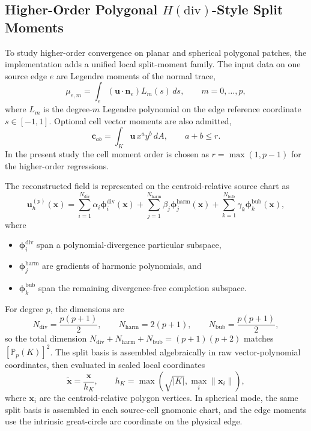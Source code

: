 \documentclass[11pt]{article}
\newcommand{\uh}{\mathbf{u}_h}
\newcommand{\x}{\mathbf{x}}
\begin{document}
\subsection{Higher-Order Polygonal \(H(\mathrm{div})\)-Style Split Moments}

To study higher-order convergence on planar and spherical polygonal patches,
the implementation adds a unified local split-moment family.  The input data on
one source edge \(e\) are Legendre moments of the normal trace,
\begin{equation}
  \mu_{e,m}
  =
  \int_e (\mathbf{u}\cdot \mathbf{n}_e) L_m(s)\, ds,
  \qquad m=0,\dots,p,
  \label{eq:edge-moment-dofs}
\end{equation}
where \(L_m\) is the degree-\(m\) Legendre polynomial on the edge reference
coordinate \(s\in[-1,1]\).  Optional cell vector moments are also admitted,
\begin{equation}
  \mathbf{c}_{ab}
  =
  \int_K \mathbf{u}\, x^a y^b \, dA,
  \qquad a+b \le r.
  \label{eq:cell-vector-moments}
\end{equation}
In the present study the cell moment order is chosen as \(r=\max(1,p-1)\) for
the higher-order regressions.

The reconstructed field is represented on the centroid-relative source chart as
\begin{equation}
  \uh^{(p)}(\x)
  =
  \sum_{i=1}^{N_{\mathrm{div}}} \alpha_i \boldsymbol{\phi}^{\mathrm{div}}_i(\x)
  +
  \sum_{j=1}^{N_{\mathrm{harm}}} \beta_j \boldsymbol{\phi}^{\mathrm{harm}}_j(\x)
  +
  \sum_{k=1}^{N_{\mathrm{bub}}} \gamma_k \boldsymbol{\phi}^{\mathrm{bub}}_k(\x),
  \label{eq:split-moment-field}
\end{equation}
where
\begin{itemize}
  \item \(\boldsymbol{\phi}^{\mathrm{div}}_i\) span a polynomial-divergence
        particular subspace,
  \item \(\boldsymbol{\phi}^{\mathrm{harm}}_j\) are gradients of harmonic
        polynomials, and
  \item \(\boldsymbol{\phi}^{\mathrm{bub}}_k\) span the remaining
        divergence-free completion subspace.
\end{itemize}
For degree \(p\), the dimensions are
\[
  N_{\mathrm{div}}=\frac{p(p+1)}{2},\qquad
  N_{\mathrm{harm}}=2(p+1),\qquad
  N_{\mathrm{bub}}=\frac{p(p+1)}{2},
\]
so the total dimension
\(
N_{\mathrm{div}}+N_{\mathrm{harm}}+N_{\mathrm{bub}}=(p+1)(p+2)
\)
matches \([\mathbb{P}_p(K)]^2\).  The split basis is assembled algebraically in
raw vector-polynomial coordinates, then evaluated in scaled local coordinates
\begin{equation}
  \tilde{\x} = \frac{\x}{h_K},
  \qquad
  h_K = \max\left(\sqrt{|K|}, \max_i \|\x_i\|\right),
  \label{eq:scaled-local-coordinates}
\end{equation}
where \(\x_i\) are the centroid-relative polygon vertices.  In spherical mode,
the same split basis is assembled in each source-cell gnomonic chart, and the
edge moments use the intrinsic great-circle arc coordinate on the physical
edge.
\end{document}
